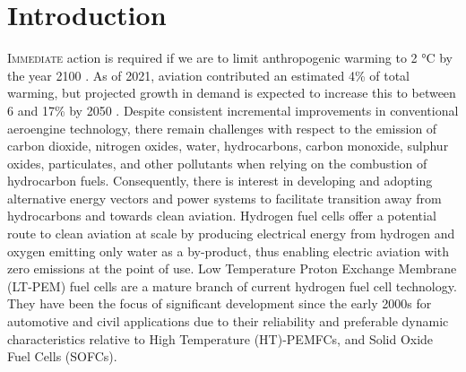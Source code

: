 \section{Introduction}

\lettrine{I}{mmediate} action is required if we are to limit anthropogenic warming to 2 °C by the year 2100 \cite{environmentEmissionsGapReport2024}.
As of 2021, aviation contributed an estimated 4\% of total warming, but projected growth in demand is expected to increase this to between 6 and 17\% by 2050 \cite{klowerQuantifyingAviationsContribution2021}.
Despite consistent incremental improvements in conventional aeroengine technology, there remain challenges with respect to the emission of carbon dioxide, nitrogen oxides, water, hydrocarbons, carbon monoxide, sulphur oxides, particulates, and other pollutants when relying on the combustion of hydrocarbon fuels.
Consequently, there is interest in developing and adopting alternative energy vectors and power systems to facilitate transition away from hydrocarbons and towards clean aviation.
Hydrogen fuel cells offer a potential route to clean aviation at scale by producing electrical energy from hydrogen and oxygen emitting only water as a by-product, thus enabling electric aviation with zero emissions at the point of use.
Low Temperature Proton Exchange Membrane (LT-PEM) fuel cells are a mature branch of current hydrogen fuel cell technology. They have been the focus of significant development since the early 2000s for automotive and civil applications due to their reliability and preferable dynamic characteristics relative to High Temperature (HT)-PEMFCs, and Solid Oxide Fuel Cells (SOFCs).

